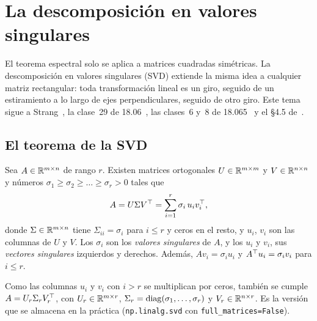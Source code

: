 \chapter{La descomposición en valores singulares}
\label{tema:4}

El teorema espectral solo se aplica a matrices cuadradas simétricas. La descomposición en valores singulares (SVD) extiende la misma idea a cualquier matriz rectangular: toda transformación lineal es un giro, seguido de un estiramiento a lo largo de ejes perpendiculares, seguido de otro giro. Este tema sigue a Strang~\cite[§7.1]{strang-ila}, la clase~29 de 18.06~\cite{mit1806}, las clases~6 y~8 de 18.065~\cite{mit18065} y el §4.5 de~\cite{mml}.

\section{El teorema de la SVD}

\begin{teorema}\label{teo:svd}
Sea $A\in\mathbb{R}^{m\times n}$ de rango $r$. Existen matrices ortogonales $U\in\mathbb{R}^{m\times m}$ y $V\in\mathbb{R}^{n\times n}$ y números $\sigma_1\ge\sigma_2\ge\dots\ge\sigma_r>0$ tales que
\[
A=U\Sigma V^{\top}=\sum_{i=1}^{r}\sigma_i\,u_iv_i^{\top},
\]
donde $\Sigma\in\mathbb{R}^{m\times n}$ tiene $\Sigma_{ii}=\sigma_i$ para $i\le r$ y ceros en el resto, y $u_i$, $v_i$ son las columnas de $U$ y $V$. Los $\sigma_i$ son los \emph{valores singulares} de $A$, y los $u_i$ y $v_i$, sus \emph{vectores singulares} izquierdos y derechos. Además, $Av_i=\sigma_iu_i$ y $A^{\top} u_i=\sigma_iv_i$ para $i\le r$.
\end{teorema}

\addtocounter{figure}{1}%

\begin{observacion}
Como las columnas $u_i$ y $v_i$ con $i>r$ se multiplican por ceros, también se cumple $A=U_r\Sigma_rV_r^{\top}$, con $U_r\in\mathbb{R}^{m\times r}$, $\Sigma_r=\operatorname{diag}(\sigma_1,\dots,\sigma_r)$ y $V_r\in\mathbb{R}^{n\times r}$. Es la versión que se almacena en la práctica (\texttt{np.linalg.svd} con \texttt{full\_matrices=False}).
\end{observacion}

